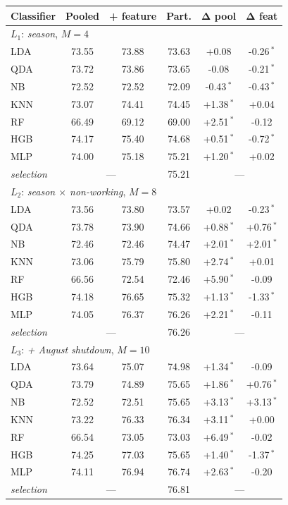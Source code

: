 \begin{tabular}{@{}lccccc@{}}
\toprule
\textbf{Classifier} & \textbf{Pooled} & \textbf{+ feature} & \textbf{Part.} & $\boldsymbol{\Delta}$\textbf{ pool} & $\boldsymbol{\Delta}$\textbf{ feat}\\
\midrule
\multicolumn{6}{l}{$L_1$: \textit{season}, $M=4$}\\
LDA & 73.55 & 73.88 & 73.63 & +0.08\phantom{\,$^{*}$} & -0.26\,$^{*}$ \\
QDA & 73.72 & 73.86 & 73.65 & -0.08\phantom{\,$^{*}$} & -0.21\,$^{*}$ \\
NB & 72.52 & 72.52 & 72.09 & -0.43\,$^{*}$ & -0.43\,$^{*}$ \\
KNN & 73.07 & 74.41 & 74.45 & +1.38\,$^{*}$ & +0.04\phantom{\,$^{*}$} \\
RF & 66.49 & 69.12 & 69.00 & +2.51\,$^{*}$ & -0.12\phantom{\,$^{*}$} \\
HGB & 74.17 & 75.40 & 74.68 & +0.51\,$^{*}$ & -0.72\,$^{*}$ \\
MLP & 74.00 & 75.18 & 75.21 & +1.20\,$^{*}$ & +0.02\phantom{\,$^{*}$} \\
\textit{selection} & \multicolumn{2}{c}{---} & 75.21 & \multicolumn{2}{c}{---}\\
\midrule
\multicolumn{6}{l}{$L_2$: \textit{season $\times$ non-working}, $M=8$}\\
LDA & 73.56 & 73.80 & 73.57 & +0.02\phantom{\,$^{*}$} & -0.23\,$^{*}$ \\
QDA & 73.78 & 73.90 & 74.66 & +0.88\,$^{*}$ & +0.76\,$^{*}$ \\
NB & 72.46 & 72.46 & 74.47 & +2.01\,$^{*}$ & +2.01\,$^{*}$ \\
KNN & 73.06 & 75.79 & 75.80 & +2.74\,$^{*}$ & +0.01\phantom{\,$^{*}$} \\
RF & 66.56 & 72.54 & 72.46 & +5.90\,$^{*}$ & -0.09\phantom{\,$^{*}$} \\
HGB & 74.18 & 76.65 & 75.32 & +1.13\,$^{*}$ & -1.33\,$^{*}$ \\
MLP & 74.05 & 76.37 & 76.26 & +2.21\,$^{*}$ & -0.11\phantom{\,$^{*}$} \\
\textit{selection} & \multicolumn{2}{c}{---} & 76.26 & \multicolumn{2}{c}{---}\\
\midrule
\multicolumn{6}{l}{$L_3$: \textit{+ August shutdown}, $M=10$}\\
LDA & 73.64 & 75.07 & 74.98 & +1.34\,$^{*}$ & -0.09\phantom{\,$^{*}$} \\
QDA & 73.79 & 74.89 & 75.65 & +1.86\,$^{*}$ & +0.76\,$^{*}$ \\
NB & 72.52 & 72.51 & 75.65 & +3.13\,$^{*}$ & +3.13\,$^{*}$ \\
KNN & 73.22 & 76.33 & 76.34 & +3.11\,$^{*}$ & +0.00\phantom{\,$^{*}$} \\
RF & 66.54 & 73.05 & 73.03 & +6.49\,$^{*}$ & -0.02\phantom{\,$^{*}$} \\
HGB & 74.25 & 77.03 & 75.65 & +1.40\,$^{*}$ & -1.37\,$^{*}$ \\
MLP & 74.11 & 76.94 & 76.74 & +2.63\,$^{*}$ & -0.20\phantom{\,$^{*}$} \\
\textit{selection} & \multicolumn{2}{c}{---} & 76.81 & \multicolumn{2}{c}{---}\\
\bottomrule
\end{tabular}
